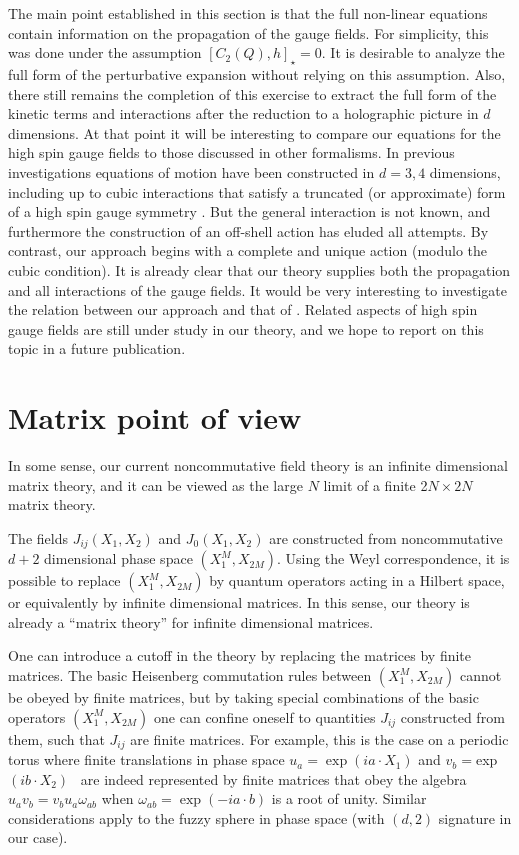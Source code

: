 \documentclass[a4paper,12pt]{article}
\begin{document}
The main point established in this section is that the full non-linear
equations contain information on the propagation of the gauge fields. For
simplicity, this was done under the assumption $\left[ C_{2}\left( Q\right)
,h\right] _{\star }=0.$ It is desirable to analyze the full form of the
perturbative expansion without relying on this assumption. Also, there still
remains the completion of this exercise to extract the full form of the
kinetic terms and interactions after the reduction to a holographic picture
in $d$ dimensions. At that point it will be interesting to compare our
equations for the high spin gauge fields to those discussed in other
formalisms. In previous investigations equations of motion have been
constructed in $d=3,4$ dimensions, including up to cubic interactions that
satisfy a truncated (or approximate) form of a high spin gauge symmetry \cite
{vasil}.  But the general interaction is not known, and furthermore the
construction of an off-shell action has eluded all attempts. By contrast,
our approach begins with a complete and unique action (modulo the cubic
condition). It is already clear that our theory supplies both the
propagation and all interactions of the gauge fields. It would be very
interesting to investigate the relation between our approach and that of 
\cite{vasil}. Related aspects of high spin gauge fields are still under
study in our theory, and we hope to report on this topic in a future
publication.

\section{Matrix point of view}

In some sense, our current noncommutative field theory is an infinite
dimensional matrix theory, and it can be viewed as the large $N$ limit of a
finite 2$N\times 2N$ matrix theory.

The fields $J_{ij}\left( X_{1},X_{2}\right) $ and $J_{0}\left(
X_{1},X_{2}\right) $ are constructed from noncommutative $d+2$ dimensional
phase space $\left( X_{1}^{M},X_{2M}\right) .$ Using the Weyl
correspondence, it is possible to replace $\left( X_{1}^{M},X_{2M}\right) $
by quantum operators acting in a Hilbert space, or equivalently by infinite
dimensional matrices. In this sense, our theory is already a ``matrix
theory'' for infinite dimensional matrices.

One can introduce a cutoff in the theory by replacing the matrices by finite
matrices. The basic Heisenberg commutation rules between $\left(
X_{1}^{M},X_{2M}\right) $ cannot be obeyed by finite matrices, but by taking
special combinations of the basic operators $\left( X_{1}^{M},X_{2M}\right) $
one can confine oneself to quantities $J_{ij}$ constructed from them, such
that $J_{ij}$ are finite matrices. For example, this is the case on a
periodic torus where finite translations in phase space $u_{a}=\exp \left(
ia\cdot X_{1}\right) $ and $v_{b}=$exp$\left( ib\cdot X_{2}\right) $ \ are
indeed represented by finite matrices that obey the algebra $%
u_{a}v_{b}=v_{b}u_{a}\omega _{ab}$ when $\omega _{ab}=\exp \left( -ia\cdot
b\right) $ is a root of unity. Similar considerations apply to the fuzzy
sphere in phase space (with $\left( d,2\right) $ signature in our case).
\end{document}
